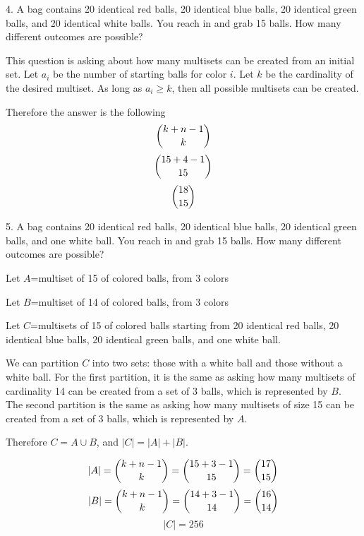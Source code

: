 \documentclass{hippoidC}
\begin{document}
\begin{prooflist}{4. A bag contains 20 identical red balls, 20 identical blue
    balls, 20 identical green balls, and 20 identical white balls. You reach in
    and grab 15 balls. How many different outcomes are possible?}
    \item This question is asking about how many multisets can be created from
        an initial set. Let $a_i$ be the number of starting balls for color $i$.
        Let $k$ be the cardinality of the desired multiset. As long as $a_i\geq k$,
        then all possible multisets can be created.
    \item Therefore the answer is the following
        $$ \dbinom{k+n-1}{k} $$
        $$ \dbinom{15+4-1}{15}$$
        $$ \dbinom{18}{15}$$
\item
\end{prooflist}

\begin{prooflist}{5. A bag contains 20 identical red balls, 20 identical blue balls, 20 identical green balls, and one white ball. You reach in and grab 15 balls. How many different outcomes are possible?}
\item Let $A$=multiset of 15 of colored balls, from 3 colors
\item Let $B$=multiset of 14 of colored balls, from 3 colors
\item Let $C$=multisets of 15 of colored balls starting from 20
    identical red balls, 20 identical blue balls, 20 identical green balls, and
    one white ball.
\item We can partition $C$ into two sets: those with a white ball and those
    without a white ball. For the first partition, it is the same as asking how
    many multisets of cardinality 14 can be created from a set of 3 balls, which
    is represented by $B$. The second partition is the same as asking how many
    multisets of size 15 can be created from a set of 3 balls, which is
    represented by $A$.
\item Therefore $C=A \cup B$, and $|C| = |A| + |B|$.
\item
    $$ |A| = \dbinom{k+n-1}{k} = \dbinom{15+3-1}{15}=\dbinom{17}{15}$$
    $$ |B| = \dbinom{k+n-1}{k} = \dbinom{14+3-1}{14}=\dbinom{16}{14}$$
    $$ |C| = 256 $$
\item
\end{prooflist}
\end{document}
